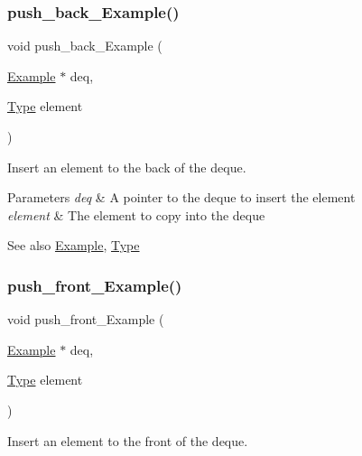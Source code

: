 \subsubsection{\texorpdfstring{push\+\_\+back\+\_\+\+Example()}{push\_back\_Example()}}
{\footnotesize\ttfamily void push\+\_\+back\+\_\+\+Example (\begin{DoxyParamCaption}\item[{\hyperlink{structExample}{Example} $\ast$}]{deq,  }\item[{\hyperlink{group__DEQUE_gac9c83c2070eb6b5891cf742b90f54c68}{Type}}]{element }\end{DoxyParamCaption})}



Insert an element to the back of the deque. 


\begin{DoxyParams}{Parameters}
{\em deq} & A pointer to the deque to insert the element\\
\hline
{\em element} & The element to copy into the deque\\
\hline
\end{DoxyParams}
\begin{DoxySeeAlso}{See also}
\hyperlink{structExample}{Example}, \hyperlink{group__DEQUE_gac9c83c2070eb6b5891cf742b90f54c68}{Type} 
\end{DoxySeeAlso}
\mbox{\label{group__DEQUE_ga7ef7f1f62eb4aa5565c04013ac376433}} 
\subsubsection{\texorpdfstring{push\+\_\+front\+\_\+\+Example()}{push\_front\_Example()}}
{\footnotesize\ttfamily void push\+\_\+front\+\_\+\+Example (\begin{DoxyParamCaption}\item[{\hyperlink{structExample}{Example} $\ast$}]{deq,  }\item[{\hyperlink{group__DEQUE_gac9c83c2070eb6b5891cf742b90f54c68}{Type}}]{element }\end{DoxyParamCaption})}



Insert an element to the front of the deque. 


